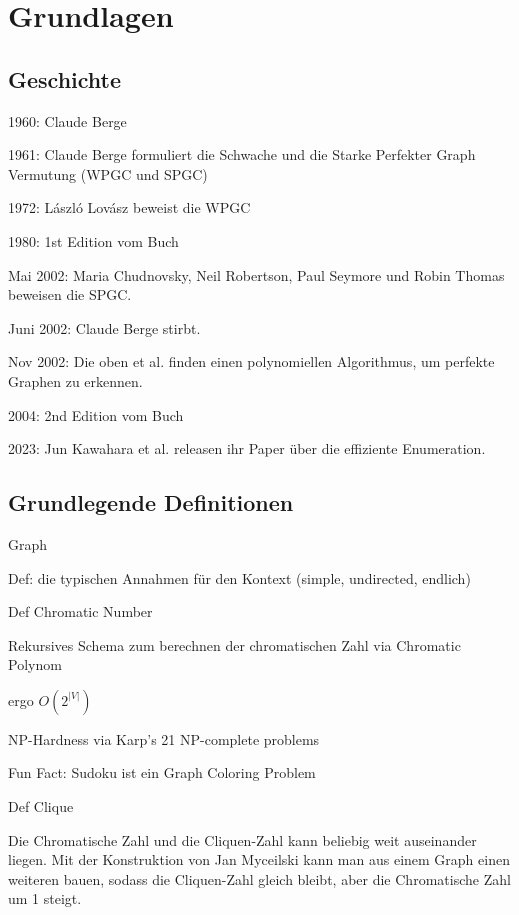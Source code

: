 \documentclass[../main.tex]{subfiles}
\begin{document}
\chapter{Grundlagen}
\label{chapter:grundlagen}

\section{Geschichte}
\label{section:geschichte}

1960: Claude Berge

1961: Claude Berge formuliert die Schwache und die Starke Perfekter Graph Vermutung (WPGC und SPGC)

1972: László Lovász beweist die WPGC

1980: 1st Edition vom Buch

Mai 2002: Maria Chudnovsky, Neil Robertson, Paul Seymore und Robin Thomas beweisen die SPGC.

Juni 2002: Claude Berge stirbt.

Nov 2002: Die oben et al. finden einen polynomiellen Algorithmus, um perfekte Graphen zu erkennen.

2004: 2nd Edition vom Buch\cite{das_Buch}

2023: Jun Kawahara et al. releasen ihr Paper über die effiziente Enumeration.

\section{Grundlegende Definitionen}
\label{section:definitionen}

\begin{definition}
    Graph
\end{definition}

Def: die typischen Annahmen für den Kontext (simple, undirected, endlich)

Def Chromatic Number

Rekursives Schema zum berechnen der chromatischen Zahl via Chromatic Polynom

ergo $O(2^{|V|})$

NP-Hardness via Karp's 21 NP-complete problems

Fun Fact: Sudoku ist ein Graph Coloring Problem

Def Clique

Die Chromatische Zahl und die Cliquen-Zahl kann beliebig weit auseinander liegen. Mit der Konstruktion von Jan Myceilski \cite{Mycielski1955} kann man aus einem Graph einen weiteren bauen, sodass die Cliquen-Zahl gleich bleibt, aber die Chromatische Zahl um 1 steigt.
\end{document}
